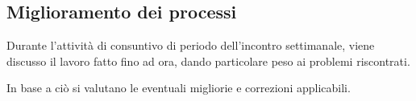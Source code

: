 \documentclass[a4paper, 12pt]{article}
\begin{document}
\subsection{Miglioramento dei processi}
Durante l'attività di consuntivo di periodo dell'incontro settimanale, viene discusso il lavoro fatto fino ad ora, dando particolare peso ai problemi riscontrati.

In base a ciò si valutano le eventuali migliorie e correzioni applicabili.
\end{document}
